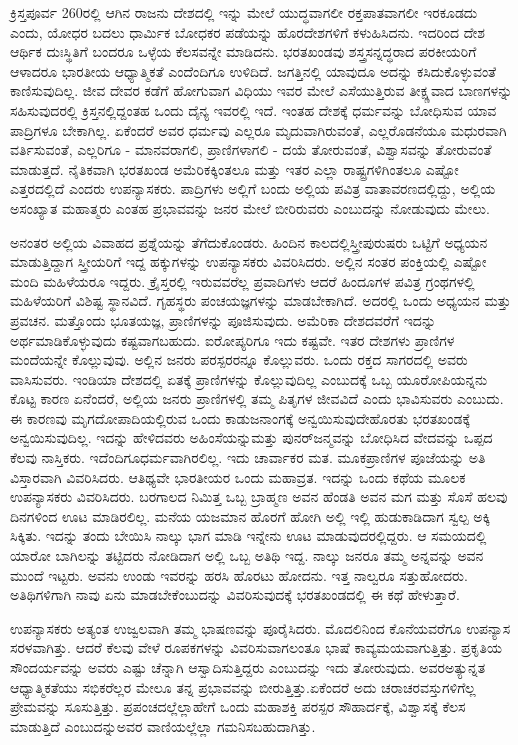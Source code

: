ಕ್ರಿಸ್ತಪೂರ್ವ 260ರಲ್ಲಿ ಆಗಿನ ರಾಜನು ದೇಶದಲ್ಲಿ ಇನ್ನು ಮೇಲೆ ಯುದ್ಧವಾಗಲೀ ರಕ್ತಪಾತವಾಗಲೀ ಇರಕೂಡದು ಎಂದು, ಯೋಧರ ಬದಲು ಧಾರ್ಮಿಕ ಬೋಧಕರ ಪಡೆಯನ್ನು ಹೊರದೇಶಗಳಿಗೆ ಕಳುಹಿಸಿದನು. ಇದರಿಂದ ದೇಶ ಆರ್ಥಿಕ ದುಃಸ್ಥಿತಿಗೆ ಬಂದರೂ ಒಳ್ಳೆಯ ಕೆಲಸವನ್ನೇ ಮಾಡಿದನು. ಭರತಖಂಡವು ಶಸ್ತ್ರಸನ್ನದ್ಧರಾದ ಪರಕೀಯರಿಗೆ ಆಳಾದರೂ ಭಾರತೀಯ ಆಧ್ಯಾತ್ಮಿಕತೆ ಎಂದೆಂದಿಗೂ ಉಳಿದಿದೆ. ಜಗತ್ತಿನಲ್ಲಿ ಯಾವುದೂ ಅದನ್ನು ಕಸಿದುಕೊಳ್ಳುವಂತೆ ಕಾಣಿಸುವುದಿಲ್ಲ. ಜೀವ ದೇವರ ಕಡೆಗೆ ಹೋಗುವಾಗ ವಿಧಿಯು ಇವರ ಮೇಲೆ ಎಸೆಯುತ್ತಿರುವ ತೀಕ್ಷ್ಣವಾದ ಬಾಣಗಳನ್ನು ಸಹಿಸುವುದರಲ್ಲಿ ಕ್ರಿಸ್ತನಲ್ಲಿದ್ದಂತಹ ಒಂದು ದೈನ್ಯ ಇವರಲ್ಲಿ ಇದೆ. ಇಂತಹ ದೇಶಕ್ಕೆ ಧರ್ಮವನ್ನು ಬೋಧಿಸುವ ಯಾವ ಪಾದ್ರಿಗಳೂ ಬೇಕಾಗಿಲ್ಲ. ಏಕೆಂದರೆ ಅವರ ಧರ್ಮವು ಎಲ್ಲರೂ ಮೃದುವಾಗಿರುವಂತೆ, ಎಲ್ಲರೊಡನೆಯೂ ಮಧುರವಾಗಿ ವರ್ತಿಸುವಂತೆ, ಎಲ್ಲರಿಗೂ - ಮಾನವರಾಗಲಿ, ಪ್ರಾಣಿಗಳಾಗಲಿ - ದಯೆ ತೋರುವಂತೆ, ವಿಶ್ವಾಸವನ್ನು ತೋರುವಂತೆ ಮಾಡುತ್ತದೆ. ನೈತಿಕವಾಗಿ ಭರತಖಂಡ ಅಮೆರಿಕಕ್ಕಿಂತಲೂ ಮತ್ತು ಇತರ ಎಲ್ಲಾ ರಾಷ್ಟ್ರಗಳಿಗಿಂತಲೂ ಎಷ್ಟೋ ಎತ್ತರದಲ್ಲಿದೆ ಎಂದರು ಉಪನ್ಯಾಸಕರು. ಪಾದ್ರಿಗಳು ಅಲ್ಲಿಗೆ ಬಂದು ಅಲ್ಲಿಯ ಪವಿತ್ರ ವಾತಾವರಣದಲ್ಲಿದ್ದು, ಅಲ್ಲಿಯ ಅಸಂಖ್ಯಾತ ಮಹಾತ್ಮರು ಎಂತಹ ಪ್ರಭಾವವನ್ನು ಜನರ ಮೇಲೆ ಬೀರಿರುವರು ಎಂಬುದನ್ನು ನೋಡುವುದು ಮೇಲು.

ಅನಂತರ ಅಲ್ಲಿಯ ವಿವಾಹದ ಪ್ರಶ್ನೆಯನ್ನು ತೆಗೆದುಕೊಂಡರು. ಹಿಂದಿನ ಕಾಲದಲ್ಲಿ\break ಸ್ತ್ರೀಪುರುಷರು ಒಟ್ಟಿಗೆ ಅಧ್ಯಯನ ಮಾಡುತ್ತಿದ್ದಾಗ ಸ್ತ್ರೀಯರಿಗೆ ಇದ್ದ ಹಕ್ಕುಗಳನ್ನು ಉಪನ್ಯಾಸಕರು ವಿವರಿಸಿದರು. ಅಲ್ಲಿನ ಸಂತರ ಪಂಕ್ತಿಯಲ್ಲಿ ಎಷ್ಟೋ ಮಂದಿ ಮಹಿಳೆಯರೂ ಇದ್ದರು. ಕ್ರೈಸ್ತರಲ್ಲಿ ಇರುವವರೆಲ್ಲ ಪ್ರವಾದಿಗಳು ಆದರೆ ಹಿಂದೂಗಳ ಪವಿತ್ರ ಗ್ರಂಥಗಳಲ್ಲಿ ಮಹಿಳೆಯರಿಗೆ ವಿಶಿಷ್ಟ ಸ್ಥಾನವಿದೆ. ಗೃಹಸ್ಥರು ಪಂಚಯಜ್ಞಗಳನ್ನು ಮಾಡಬೇಕಾಗಿದೆ. ಅದರಲ್ಲಿ ಒಂದು ಅಧ್ಯಯನ ಮತ್ತು ಪ್ರವಚನ. ಮತ್ತೊಂದು ಭೂತಯಜ್ಞ, ಪ್ರಾಣಿಗಳನ್ನು ಪೂಜಿಸುವುದು. ಅಮೆರಿಕಾ ದೇಶದವರೆಗೆ ಇದನ್ನು ಅರ್ಥಮಾಡಿಕೊಳ್ಳುವುದು ಕಷ್ಟವಾಗಬಹುದು. ಐರೋಪ್ಯರಿಗೂ ಇದು ಕಷ್ಟವೇ. ಇತರ ದೇಶಗಳು ಪ್ರಾಣಿಗಳ ಮಂದೆಯನ್ನೇ ಕೊಲ್ಲುವುವು. ಅಲ್ಲಿನ ಜನರು ಪರಸ್ಪರರನ್ನೂ ಕೊಲ್ಲುವರು. ಒಂದು ರಕ್ತದ ಸಾಗರದಲ್ಲಿ ಅವರು ವಾಸಿಸುವರು. ಇಂಡಿಯಾ ದೇಶದಲ್ಲಿ ಏತಕ್ಕೆ ಪ್ರಾಣಿಗಳನ್ನು ಕೊಲ್ಲುವುದಿಲ್ಲ ಎಂಬುದಕ್ಕೆ ಒಬ್ಬ ಯೂರೋಪಿಯನ್ನನು ಕೊಟ್ಟ ಕಾರಣ ಏನೆಂದರೆ, ಅಲ್ಲಿಯ ಜನರು ಪ್ರಾಣಿಗಳಲ್ಲಿ ತಮ್ಮ ಪಿತೃಗಳ ಜೀವವಿದೆ ಎಂದು ಭಾವಿಸುವರು ಎಂಬುದು. ಈ ಕಾರಣವು ಮೃಗದೋಪಾದಿಯಲ್ಲಿರುವ ಒಂದು ಕಾಡುಜನಾಂಗಕ್ಕೆ ಅನ್ವಯಿಸುವುದೇ\break ಹೊರತು ಭರತಖಂಡಕ್ಕೆ ಅನ್ವಯಿಸುವುದಿಲ್ಲ. ಇದನ್ನು ಹೇಳಿದವರು ಅಹಿಂಸೆಯನ್ನು\break ಮತ್ತು ಪುನರ್​ಜನ್ಮವನ್ನು ಬೋಧಿಸಿದ ವೇದವನ್ನು ಒಪ್ಪದ ಕೆಲವು ನಾಸ್ತಿಕರು. ಇದೆಂದಿಗೂ\break ಧರ್ಮವಾಗಿರಲಿಲ್ಲ. ಇದು ಚಾರ್ವಾಕರ ಮತ. ಮೂಕಪ್ರಾಣಿಗಳ ಪೂಜೆಯನ್ನು ಅತಿ ವಿಸ್ತಾರವಾಗಿ ವಿವರಿಸಿದರು. ಆತಿಥ್ಯವೇ ಭಾರತೀಯರ ಒಂದು ಮಹಾವ್ರತ. ಇದನ್ನು ಒಂದು ಕಥೆಯ ಮೂಲಕ ಉಪನ್ಯಾಸಕರು ವಿವರಿಸಿದರು. ಬರಗಾಲದ ನಿಮಿತ್ತ ಒಬ್ಬ ಬ್ರಾಹ್ಮಣ ಅವನ ಹೆಂಡತಿ ಅವನ ಮಗ ಮತ್ತು ಸೊಸೆ ಹಲವು ದಿನಗಳಿಂದ ಊಟ ಮಾಡಿರಲಿಲ್ಲ. ಮನೆಯ ಯಜಮಾನ ಹೊರಗೆ ಹೋಗಿ ಅಲ್ಲಿ ಇಲ್ಲಿ ಹುಡುಕಾಡಿದಾಗ ಸ್ವಲ್ಪ ಅಕ್ಕಿ ಸಿಕ್ಕಿತು. ಇದನ್ನು ತಂದು ಬೇಯಿಸಿ ನಾಲ್ಕು ಭಾಗ ಮಾಡಿ ಇನ್ನೇನು ಊಟ ಮಾಡುವುದರಲ್ಲಿದ್ದರು. ಆ ಸಮಯದಲ್ಲಿ ಯಾರೋ ಬಾಗಿಲನ್ನು ತಟ್ಟಿದರು ನೋಡಿದಾಗ ಅಲ್ಲಿ ಒಬ್ಬ ಅತಿಥಿ ಇದ್ದ. ನಾಲ್ಕು ಜನರೂ ತಮ್ಮ ಅನ್ನವನ್ನು ಅವನ ಮುಂದೆ ಇಟ್ಟರು. ಅವನು ಉಂಡು ಇವರನ್ನು ಹರಸಿ ಹೊರಟು ಹೋದನು. ಇತ್ತ ನಾಲ್ವರೂ ಸತ್ತುಹೋದರು. ಅತಿಥಿಗಳಿಗಾಗಿ ನಾವು ಏನು ಮಾಡಬೇಕೆಂಬುದನ್ನು ವಿವರಿಸುವುದಕ್ಕೆ ಭರತಖಂಡದಲ್ಲಿ ಈ ಕಥೆ ಹೇಳುತ್ತಾರೆ.

ಉಪನ್ಯಾಸಕರು ಅತ್ಯಂತ ಉಜ್ವಲವಾಗಿ ತಮ್ಮ ಭಾಷಣವನ್ನು ಪೂರೈಸಿದರು. ಮೊದಲಿನಿಂದ ಕೊನೆಯವರೆಗೂ ಉಪನ್ಯಾಸ ಸರಳವಾಗಿತ್ತು. ಆದರೆ ಕೆಲವು ವೇಳೆ ರೂಪಕಗಳನ್ನು ವಿವರಿಸುವಾಗಲಂತೂ ಭಾಷೆ ಕಾವ್ಯಮಯವಾಗುತ್ತಿತ್ತು. ಪ್ರಕೃತಿಯ ಸೌಂದರ್ಯವನ್ನು ಅವರು ಎಷ್ಟು ಚೆನ್ನಾಗಿ ಆಸ್ವಾದಿಸುತ್ತಿದ್ದರು ಎಂಬುದನ್ನು ಇದು ತೋರುವುದು. ಅವರ\break ಅತ್ಯುನ್ನತ ಆಧ್ಯಾತ್ಮಿಕತೆಯು ಸಭಿಕರೆಲ್ಲರ ಮೇಲೂ ತನ್ನ ಪ್ರಭಾವವನ್ನು ಬೀರುತ್ತಿತ್ತು.\break ಏಕೆಂದರೆ ಅದು ಚರಾಚರವಸ್ತುಗಳಿಗೆಲ್ಲ ಪ್ರೇಮವನ್ನು ಸೂಸುತ್ತಿತ್ತು. ಪ್ರಪಂಚದಲ್ಲೆಲ್ಲಾ\break ಹೇಗೆ ಒಂದು ಮಹಾಶಕ್ತಿ ಪರಸ್ಪರ ಸೌಹಾರ್ದಕ್ಕೆ, ವಿಶ್ವಾಸಕ್ಕೆ ಕೆಲಸ ಮಾಡುತ್ತಿದೆ ಎಂಬುದನ್ನು\break ಅವರ ವಾಣಿಯಲ್ಲೆಲ್ಲಾ ಗಮನಿಸಬಹುದಾಗಿತ್ತು.

